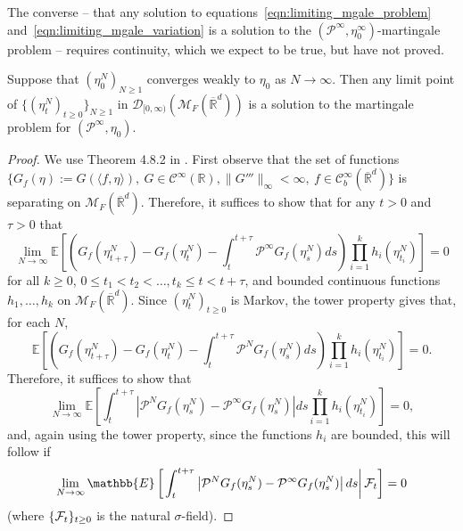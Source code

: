 \documentclass[EJP]{ejpecp} %
\newcommand{\IR}{\mathbb R}
\newcommand{\Pgen}{\mathcal{P}}    %
\newcommand{\cmeasures}{\mathcal{M}_F(\overline{\IR}^d)} %
\begin{document}
The converse -- that any solution to equations~\eqref{eqn:limiting_mgale_problem}
and~\eqref{eqn:limiting_mgale_variation}
is a solution to the $(\Pgen^{\infty}, \eta^\infty_0)$-martingale problem --
requires continuity, which we expect to be true, but have not proved.

\begin{lemma}
    \label{lem:limit_mgale}
Suppose that $(\eta^{N}_0)_{N\geq 1}$ converges weakly to $\eta_0$ as 
$N\to\infty$.
Then any limit point of $\{(\eta^{N}_t)_{t \geq 0}\}_{N\geq 1}$ 
in $\mathcal{D}_{[0,\infty)}(\cmeasures)$ 
is a solution to the martingale problem for 
$(\Pgen^\infty, \eta_0)$.
\end{lemma}
\begin{proof}
We use Theorem 4.8.2 in \cite{ethier/kurtz:1986}.
First observe that the set of functions
$\{G_f(\eta):= G(\langle f, \eta \rangle ),~
G \in \mathcal{C}^{\infty}(\IR), \|G'''\|_\infty<\infty,~
f \in \mathcal{C}_{b}^\infty(\overline{\IR}^d)\}$
is separating 
on $\mathcal{M}_F(\overline{\IR}^d)$.
Therefore, it suffices to show that for any $t>0$ and $\tau > 0$ that
\begin{equation}
    \label{eq: Convergence Condition}
\lim_{N \to \infty}
\mathbb{E}\left[
\left(
G_f(\eta^{N}_{t+\tau})-G_f(\eta^{N}_t)
-\int_{t}^{t+\tau}\Pgen^{\infty}G_f(\eta^{N}_s)ds
\right)
\prod_{i=1}^{k} h_i(\eta^{N}_{t_i})
\right]=0
\end{equation}
for all $k\geq 0$, $0\leq t_1<t_2<\ldots,t_k \leq t < t+\tau$,
and 
bounded continuous functions 
$h_1,\ldots,h_k$ on $\cmeasures$.
Since $(\eta^N_t)_{t\geq 0}$ is Markov, the tower property gives that,
for each $N$,
\begin{equation}
    \label{eq: Prelimit MP Application}
\mathbb{E}\left[
\left(
G_f(\eta^{N}_{t+\tau})-G_f(\eta^{N}_t)
-\int_{t}^{t+\tau}\Pgen^{N}G_f(\eta^{N}_s)ds
\right)
\prod_{i=1}^{k}h_i(\eta^{N}_{t_i})
\right]=0 .
\end{equation}
Therefore, it suffices to show that 
\begin{equation}
    \label{eq: Convergence of Spatial Generator}
\lim_{N \to \infty}
\mathbb{E}\left[
\int_{t}^{t+\tau}
\left|
\Pgen^{N}G_f(\eta^{N}_s)
-\Pgen^{\infty}G_f(\eta^{N}_s)
\right|
ds
\prod_{i=1}^{k}h_i(\eta^{N}_{t_i})
\right]=0,
\end{equation}
and, again using the tower property, since the functions $h_i$ are
bounded, this will follow if
\begin{equation}
\lim_{N \to \infty}
\mathbb{E}\left[\left.
\int_{t}^{t+\tau}
\left|
\Pgen^{N}G_f(\eta^{N}_s)
-\Pgen^{\infty}G_f(\eta^{N}_s)
\right|
ds\right| {\cal F}_t\right]=0
\end{equation}
(where $\{{\cal F}_t\}_{t\geq 0}$ is the natural $\sigma$-field).


\end{proof}
\end{document}

